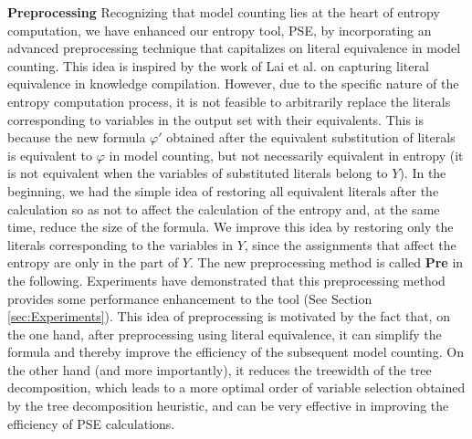 \textbf{Preprocessing} 
Recognizing that model counting lies at the heart of entropy computation, we have enhanced our entropy tool, PSE, by incorporating an advanced preprocessing technique that capitalizes on literal equivalence in model counting. 
This idea is inspired by the work of Lai et al. \cite{lai2021power} on capturing literal equivalence in knowledge compilation.
However, due to the specific nature of the entropy computation process, it is not feasible to arbitrarily replace the literals corresponding to variables in the output set with their equivalents.
This is because the new formula $\varphi'$ obtained after the equivalent substitution of literals is equivalent to $\varphi$ in model counting, but not necessarily equivalent in entropy (it is not equivalent when the variables of substituted literals belong to $Y$).
In the beginning, we had the simple idea of restoring all equivalent literals after the calculation so as not to affect the calculation of the entropy and, at the same time, reduce the size of the formula.
We improve this idea by restoring only the literals corresponding to the variables in $Y$, since the assignments that affect the entropy are only in the part of $Y$. 
The new preprocessing method is called \textbf{Pre} in the following.
Experiments have demonstrated that this preprocessing method provides some performance enhancement to the tool (See Section \ref{sec:Experiments}).
This idea of preprocessing is motivated by the fact that, on the one hand, after preprocessing using literal equivalence, it can simplify the formula and thereby improve the efficiency of the subsequent model counting.
On the other hand (and more importantly), it reduces the treewidth of the tree decomposition, which leads to a more optimal order of variable selection obtained by the tree decomposition heuristic, and can be very effective in improving the efficiency of PSE calculations.




